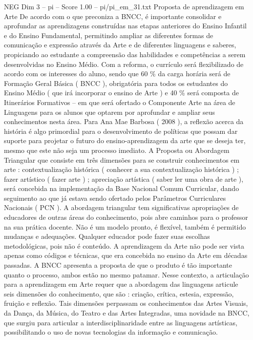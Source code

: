 \begin{textsample}{NEG Dim 3 – pi – Score 1.00 – pi/pi\_em\_31.txt}  \label{ex:f3_neg_033}
Proposta de aprendizagem em Arte De acordo com o que preconiza a BNCC, é importante consolidar e aprofundar as aprendizagens construídas nas etapas anteriores do Ensino Infantil e do Ensino Fundamental, permitindo ampliar as diferentes formas de comunicação e expressão através da Arte e de diferentes linguagens e saberes, propiciando ao estudante a compreensão das habilidades e competências a serem desenvolvidas no Ensino Médio.
Com a reforma, o currículo será flexibilizado de acordo com os interesses do aluno, sendo que 60 \% da carga horária será de Formação Geral Básica ( BNCC ), obrigatória para todos os estudantes do Ensino Médio ( que irá incorporar o ensino de Arte ) e 40 \% será composta de Itinerários Formativos – em que será ofertado o Componente Arte na área de Linguagens para os alunos que optarem por aprofundar e ampliar seus conhecimentos nesta área.
Para Ana Mae Barbosa ( 2008 ), a reflexão acerca da história é algo primordial para o desenvolvimento de políticas que possam dar suporte para projetar o futuro do ensino-aprendizagem da arte que se deseja ter, mesmo que este não seja um processo imediato.
A Proposta ou Abordagem Triangular que consiste em três dimensões para se construir conhecimentos em arte : contextualização histórica ( conhecer a sua contextualização histórica ) ; fazer artístico ( fazer arte ) ; apreciação artística ( saber ler uma obra de arte ), será concebida na implementação da Base Nacional Comum Curricular, dando seguimento ao que já estava sendo ofertado pelos Parâmetros Curriculares Nacionais ( PCN ).
A abordagem triangular tem significativas apropriações de educadores de outras áreas do conhecimento, pois abre caminhos para o professor na sua prática docente.
Não é um modelo pronto, é flexível, também é permitido mudanças e adequações.
Qualquer educador pode fazer suas escolhas metodológicas, pois não é conteúdo.
A aprendizagem da Arte não pode ser vista apenas como códigos e técnicas, que era concebida no ensino da Arte em décadas passadas.
A BNCC apresenta a proposta de que o produto é tão importante quanto o processo, ambos estão no mesmo patamar.
Nesse contexto, a articulação para a aprendizagem em Arte requer que a abordagem das linguagens articule seis dimensões do conhecimento, que são : criação, crítica, estesia, expressão, fruição e reflexão.
Tais dimensões perpassam os conhecimentos das Artes Visuais, da Dança, da Música, do Teatro e das Artes Integradas, uma novidade na BNCC, que surgiu para articular a interdisciplinaridade entre as linguagens artísticas, possibilitando o uso de novas tecnologias da informação e comunicação.

\end{textsample}
